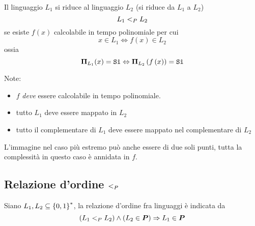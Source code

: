 \begin{definition}[Riducibilità]
    \label{def:riducibilita}
    Il linguaggio $L_1$ si riduce al linguaggio $L_2$ (si riduce da $L_1$ a $L_2$)
    \begin{equation*}
        L_1 <_P L_2
    \end{equation*}
    se esiste $f(x)$ calcolabile in tempo polinomiale per cui
    \begin{equation*}
        x \in L_1 \Leftrightarrow f(x) \in L_2
    \end{equation*}
    ossia
    \begin{equation*}
        \bm{\Pi}_{L_{1}} (x) = \texttt{Sì}
        \Leftrightarrow
        \bm{\Pi}_{L_{2}} \left( f\left( x \right) \right) = \texttt{Sì}
    \end{equation*}
\end{definition}
Note: 
\begin{itemize}[noitemsep,parsep=0pt,partopsep=0pt,topsep=0pt]
    \item $f$ \emph{deve} essere calcolabile in tempo polinomiale.
    \item tutto $L_1$ deve essere mappato in $L_2$
    \item tutto il complementare di $L_1$ deve essere mappato nel complementare di $L_2$
\end{itemize}
L'immagine nel caso più estremo può anche essere di due soli punti, tutta la complessità in questo caso è annidata in $f$.

\subsection{Relazione d'ordine $<_P$}
\label{sss:relazioneordinelp}

\begin{theorem}
    \label{teo:relazioneordine}
    Siano $L_1, L_2 \subseteq \left\{0,1\right\}^{*}$, la relazione d'ordine fra linguaggi è indicata da
    \begin{equation*}
        \left( L_1 <_P L_2 \right) \wedge \left( L_2 \in \bm{P} \right) \Rightarrow L_1 \in \bm{P}
    \end{equation*}
\end{theorem}

